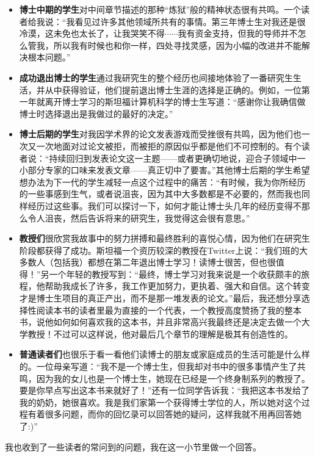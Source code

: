 \documentclass[letter,12pt]{book}
\begin{document}
\begin{CJK}{UTF8}{gbsn}
\begin{itemize}
  \item \textbf{博士中期的学生}对中间章节描述的那种“炼狱”般的精神状态很有共鸣。一个读者给我说：“我看见过许多其他领域所共有的事情。第三年博士生对我还是很冷漠，这未免也太长了，让我哭笑不得$\cdots\cdots$我有资金支持，但我的导师并不怎么管我，所以我有时候也和你一样，四处寻找灵感，因为小幅的改进并不能解决根本问题。”
  \item \textbf{成功退出博士的学生}通过我研究生的整个经历也间接地体验了一番研究生生活，并从中获得验证，他们提前退出博士生涯的选择是正确的。例如，一位第一年就离开博士学习的斯坦福计算机科学的博士生写道：“感谢你让我确信做博士时选择退出是我做过的最好的决定。”
  \item \textbf{博士后期的学生}对我因学术界的论文发表游戏而受挫很有共鸣，因为他们也一次又一次地面对过论文被拒，而被拒的原因似乎都是他们不可控制的。有个读者说：“持续回归到发表论文这一主题——或者更确切地说，迎合子领域中一小部分专家的口味来发表文章——真正切中了要害。”其他博士后期的学生希望想办法为下一代的学生减轻一点这个过程中的痛苦：“有时候，我为你所经历的一些事感到生气，或者说沮丧，因为其中大多数都是不必要的，然而我也同样经历过这些事。我们可以探讨一下，如何才能让博士头几年的经历变得不那么令人沮丧，然后告诉将来的研究生，我觉得这会很有意思。”
  \item \textbf{教授们}很欣赏我故事中的努力拼搏和最终胜利的喜悦心情，因为他们在研究生阶段都获得了成功。斯坦福一个资历较深的教授在Twitter上说：“我们班的大多数人（包括我）都想在第二年退出博士学习！读博士很苦，但也很值得！”另一个年轻的教授写到：“最终，博士学习对我来说是一个收获颇丰的旅程，他帮助我成长了许多，我工作更加努力，更执着、强大和自信。这个转变才是博士生项目的真正产出，而不是那一堆发表的论文。”最后，我还想分享选择性阅读本书的读者里最为直接的一个代表，一个教授高度赞扬了我的整本书，说他如何如何喜欢我的这本书，并且非常高兴我最终还是决定去做一个大学教授！不过可以这样说，他对最后几个章节的理解是极其有创造性的。
  \item \textbf{普通读者们}也很乐于看一看他们读博士的朋友或家庭成员的生活可能是什么样的。一位母亲写道：“我不是一个博士生，但我却对书中的很多事情产生了共鸣，因为我的女儿也是一个博士生，她现在已经是一个终身制系列的教授了。要是你早点写出这本书来就好了！”还有一位同学告诉我：“我把这本书发给了我的奶奶，她很喜欢。我是我们家第一个获得博士学位的人，所以她对这个过程有着很多问题，而你的回忆录可以回答她的疑问，这样我就不用再回答她了:)”
\end{itemize}

\breakline

我也收到了一些读者的常问到的问题，我在这一小节里做一个回答。


\end{CJK}
\end{document}
